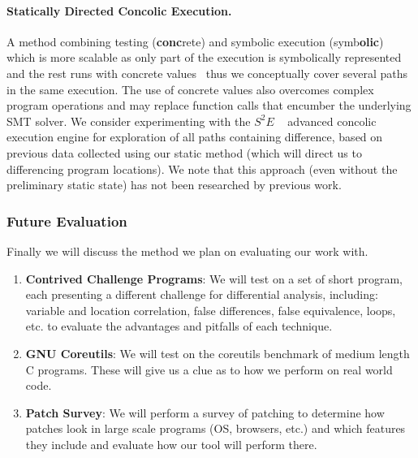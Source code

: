\paragraph{Statically Directed Concolic Execution.} A method combining testing (\textbf{conc}rete) and symbolic execution (symb\textbf{olic}) which is more scalable as only part of the execution is symbolically represented and the rest runs with concrete values~\cite{ChipounovKuznetsovCandea12} thus we conceptually cover several paths in the same execution. The use of concrete values also overcomes complex program operations and may replace function calls that encumber the underlying SMT solver. We consider experimenting with the $S^{2}E$ ~\cite{ChipounovKuznetsovCandea12} advanced concolic execution engine for exploration of all paths containing difference, based on previous data collected using our static method (which will direct us to differencing program locations). We note that this approach (even without the preliminary static state) has not been researched by previous work.


\subsubsection{Future Evaluation}

Finally we will discuss the method we plan on evaluating our work with.
\begin{enumerate}
\item \textbf{Contrived Challenge Programs}: We will test on a set of short program, each presenting a different challenge for differential analysis, including: variable and location correlation, false differences, false equivalence, loops, etc. to evaluate the advantages and pitfalls of each technique.
\item \textbf{GNU Coreutils}: We will test on the coreutils benchmark of medium length C programs. These will give us a clue as to how we perform on real world code.
\item \textbf{Patch Survey}: We will perform a survey of patching to determine how patches look in large scale programs (OS, browsers, etc.) and which features they include and evaluate how our tool will perform there.
\end{enumerate}


